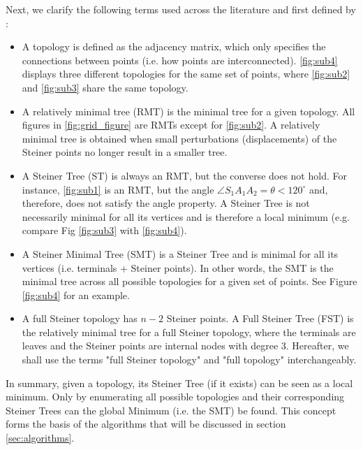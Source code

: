 \documentclass{l4proj}
\begin{document}
Next, we clarify the following terms used across the literature and first defined by \cite{Gilbert1968SteinerMT}:
\begin{itemize}
    \item A topology is defined as the adjacency matrix, which only specifies the connections between points (i.e. how points are interconnected). \ref{fig:sub4} displays three different topologies for the same set of points, where \ref{fig:sub2} and \ref{fig:sub3} share the same topology.
    \item\label{prop:rmt_def} A relatively minimal tree (RMT) is the minimal tree for a given topology. All figures in \ref{fig:grid_figure} are RMTs except for \ref{fig:sub2}. A relatively minimal tree is obtained when small perturbations (displacements) of the Steiner points no longer result in a smaller tree.
    \item  A Steiner Tree (ST) is always an RMT, but the converse does not hold. For instance, \ref{fig:sub1} is an RMT, but the angle $\angle S_1A_1A_2 = \theta < 120^\circ$ and, therefore, does not satisfy the angle property. A Steiner Tree is not necessarily minimal for all its vertices and is therefore a local minimum (e.g. compare Fig \ref{fig:sub3} with \ref{fig:sub4}).
    \item A Steiner Minimal Tree (SMT) is a Steiner Tree and is minimal for all its vertices (i.e. terminals + Steiner points). In other words, the SMT is the minimal tree across all possible topologies for a given set of points. See Figure \ref{fig:sub4} for an example.
    \item \label{prop:fst_definition} A full Steiner topology has $n - 2$ Steiner points. A Full Steiner Tree (FST) is the relatively minimal tree for a full Steiner topology, where the terminals are leaves and the Steiner points are internal nodes with degree 3. Hereafter, we shall use the terms "full Steiner topology" and "full topology" interchangeably.
\end{itemize}

In summary, given a topology, its Steiner Tree (if it exists) can be seen as a local minimum. Only by enumerating all possible topologies and their corresponding Steiner Trees can the global Minimum (i.e. the SMT) be found. This concept forms the basis of the algorithms that will be discussed in section \ref{sec:algorithms}.
\end{document}
